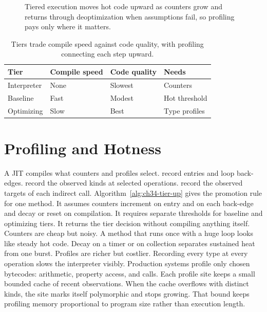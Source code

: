 \begin{figure}[htbp]
\centering
{}
\caption{Tiered execution moves hot code upward as counters grow and returns through deoptimization when assumptions fail, so profiling pays only where it matters.}
\label{fig:ch34-tiers}
\end{figure}

\begin{table}[htbp]
\centering
\caption{Tiers trade compile speed against code quality, with profiling connecting each step upward.}
\label{tab:ch34-tiers}
\begin{tabular}{llll}
\toprule
Tier & Compile speed & Code quality & Needs \\
\midrule
Interpreter & None & Slowest & Counters \\
Baseline & Fast & Modest & Hot threshold \\
Optimizing & Slow & Best & Type profiles \\
\bottomrule
\end{tabular}
\end{table}

\section{Profiling and Hotness}\label{sec:ch34-profiling}

A JIT compiles what counters and profiles select.
 record entries and loop back-edges.
 record the observed kinds at selected operations.
 record the observed targets of each indirect call.
Algorithm~\ref{alg:ch34-tier-up} gives the promotion rule for one method.
It assumes counters increment on entry and on each back-edge and decay or reset on compilation.
It requires separate thresholds for baseline and optimizing tiers.
It returns the tier decision without compiling anything itself.
Counters are cheap but noisy.
A method that runs once with a huge loop looks like steady hot code.
Decay on a timer or on collection separates sustained heat from one burst.
Profiles are richer but costlier.
Recording every type at every operation slows the interpreter visibly.
Production systems profile only chosen bytecodes: arithmetic, property access, and calls.
Each profile site keeps a small bounded cache of recent observations.
When the cache overflows with distinct kinds, the site marks itself polymorphic and stops growing.
That bound keeps profiling memory proportional to program size rather than execution length.

